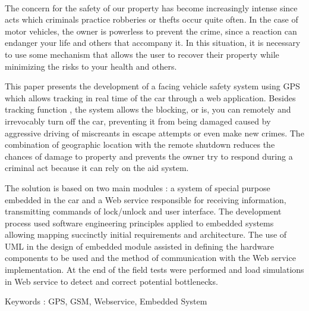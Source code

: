 \\[2cm]
The concern for the safety of our property has become increasingly intense since acts which criminals practice robberies or thefts occur quite often. In the case of motor vehicles, the owner is powerless to prevent the crime, since a reaction can endanger your life and others that accompany it. In this situation, it is necessary to use some mechanism that allows the user to recover their property while minimizing the risks to your health and others.

This paper presents the development of a facing vehicle safety system using GPS which allows tracking in real time of the car through a web application. Besides tracking function , the system allows the blocking, or is, you can remotely and irrevocably turn off the car, preventing it from being damaged caused by aggressive driving of miscreants in escape attempts or even make new crimes. The combination of geographic location with the remote shutdown reduces the chances of damage to property and prevents the owner try to respond during a criminal act because it can rely on the aid system.

The solution is based on two main modules : a system of special purpose embedded in the car and a Web service responsible for receiving information, transmitting commands of lock/unlock and user interface. The development process used software engineering principles applied to embedded systems allowing mapping succinctly initial requirements and architecture. The use of UML in the design of embedded module assisted in defining the hardware components to be used and the method of communication with the Web service implementation. At the end of the field tests were performed and load simulations in Web service to detect and correct potential bottlenecks.


Keywords : GPS, GSM, Webservice, Embedded System
